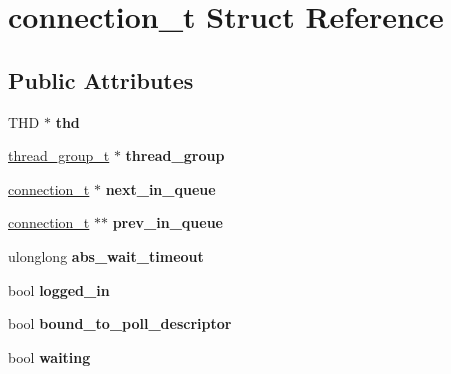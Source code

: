 \hypertarget{structconnection__t}{}\section{connection\+\_\+t Struct Reference}
\label{structconnection__t}
\subsection*{Public Attributes}
\begin{DoxyCompactItemize}
\item 
\mbox{\label{structconnection__t_a5b0fc5c3733f534591c38e1bbb42147f}} 
T\+HD $\ast$ {\bfseries thd}
\item 
\mbox{\label{structconnection__t_aff5bc6198722322f9cd7cc7ef8c64dd9}} 
\mbox{\hyperlink{structthread__group__t}{thread\+\_\+group\+\_\+t}} $\ast$ {\bfseries thread\+\_\+group}
\item 
\mbox{\label{structconnection__t_aa8d1e6cfa9f5a7c7c60bf7e9014f4603}} 
\mbox{\hyperlink{structconnection__t}{connection\+\_\+t}} $\ast$ {\bfseries next\+\_\+in\+\_\+queue}
\item 
\mbox{\label{structconnection__t_ad8e698562d6a4125fb199c94444a8326}} 
\mbox{\hyperlink{structconnection__t}{connection\+\_\+t}} $\ast$$\ast$ {\bfseries prev\+\_\+in\+\_\+queue}
\item 
\mbox{\label{structconnection__t_a9a9ffe2b2db4b966df4309bb87c3faf0}} 
ulonglong {\bfseries abs\+\_\+wait\+\_\+timeout}
\item 
\mbox{\label{structconnection__t_a1cc77ed91ab9ce32948bf373a456f237}} 
bool {\bfseries logged\+\_\+in}
\item 
\mbox{\label{structconnection__t_a0b4e6707bef665147cbd5d8cbac3217e}} 
bool {\bfseries bound\+\_\+to\+\_\+poll\+\_\+descriptor}
\item 
\mbox{\label{structconnection__t_a80793a1c7e60f17f75dd9ded32cad58e}} 
bool {\bfseries waiting}
\item 
\mbox{\label{structconnection__t_affb3c2e7e7a103e8a0a2915d9cbaaff8}} 
$$
\end{DoxyCompactItemize}
